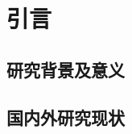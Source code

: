 \chapter{引言}
\label{cha:introduction}
\section{研究背景及意义}
\label{sec:background}

\newpage
\section{国内外研究现状}
\label{sec:research_status}

